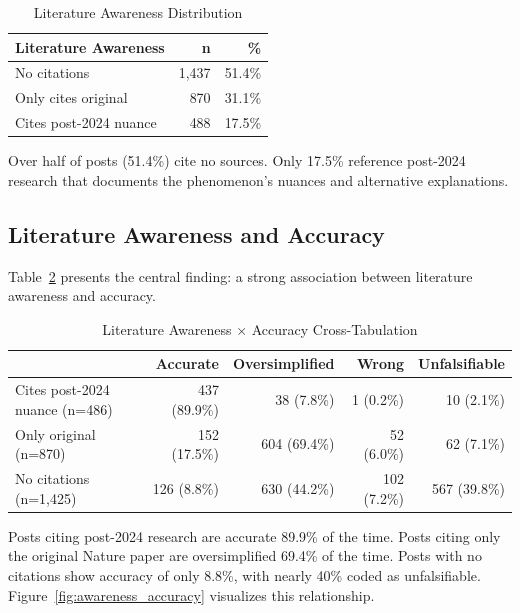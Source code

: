 \documentclass[11pt,preprint]{article}
\begin{document}
\begin{table}[h]
\centering
\caption{Literature Awareness Distribution}
\label{tab:lit_awareness}
\begin{tabular}{lrr}
\toprule
\textbf{Literature Awareness} & \textbf{n} & \textbf{\%} \\
\midrule
No citations & 1,437 & 51.4\% \\
Only cites original & 870 & 31.1\% \\
Cites post-2024 nuance & 488 & 17.5\% \\
\bottomrule
\end{tabular}
\end{table}

Over half of posts (51.4\%) cite no sources. Only 17.5\% reference post-2024 research that documents the phenomenon's nuances and alternative explanations.

\subsection{Literature Awareness and Accuracy}
\label{sec:awareness_accuracy}

Table~\ref{tab:lit_accuracy_crosstab} presents the central finding: a strong association between literature awareness and accuracy.

\begin{table}[h]
\centering
\caption{Literature Awareness $\times$ Accuracy Cross-Tabulation}
\label{tab:lit_accuracy_crosstab}
\begin{tabular}{lrrrr}
\toprule
& \textbf{Accurate} & \textbf{Oversimplified} & \textbf{Wrong} & \textbf{Unfalsifiable} \\
\midrule
Cites post-2024 nuance (n=486) & 437 (89.9\%) & 38 (7.8\%) & 1 (0.2\%) & 10 (2.1\%) \\
Only original (n=870) & 152 (17.5\%) & 604 (69.4\%) & 52 (6.0\%) & 62 (7.1\%) \\
No citations (n=1,425) & 126 (8.8\%) & 630 (44.2\%) & 102 (7.2\%) & 567 (39.8\%) \\
\bottomrule
\end{tabular}
\end{table}

Posts citing post-2024 research are accurate 89.9\% of the time. Posts citing only the original Nature paper are oversimplified 69.4\% of the time. Posts with no citations show accuracy of only 8.8\%, with nearly 40\% coded as unfalsifiable. Figure~\ref{fig:awareness_accuracy} visualizes this relationship.
\end{document}
